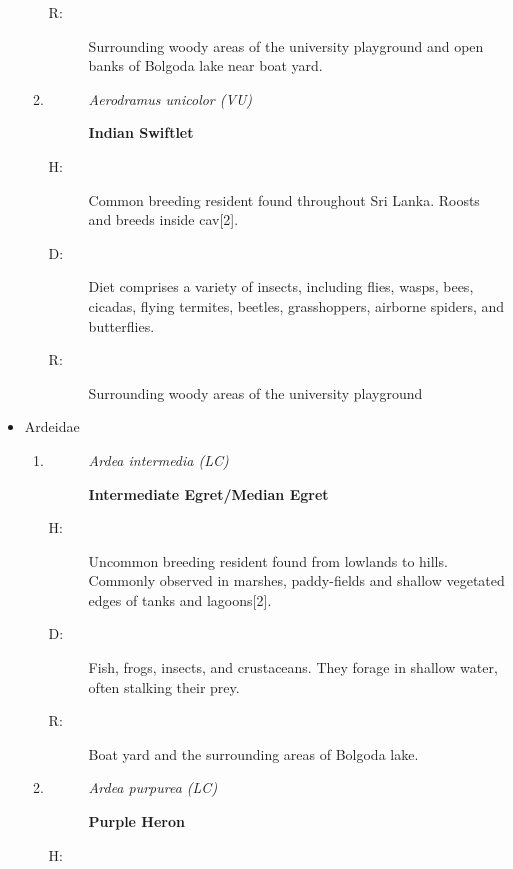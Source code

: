 \begin{itemize}
\begin{enumerate}
\begin{description}
\item[R: ]%
Surrounding woody areas of the university playground and open banks of Bolgoda lake near boat yard.%
\end{description}%
\item%
\begin{description}%
\item[]%
\textit{Aerodramus unicolor (VU)}%
\item[]%
\textbf{Indian Swiftlet}%
\end{description}%
\begin{description}%
\item[H: ]%
Common breeding resident found throughout Sri Lanka. Roosts and breeds inside cav{[}2{]}.%
\item[D: ]%
Diet comprises a variety of insects, including flies, wasps, bees, cicadas, flying termites, beetles, grasshoppers, airborne spiders, and butterflies.%
\item[R: ]%
Surrounding woody areas of the university playground%
\end{description}%
\end{enumerate}%
\item%
Ardeidae%
\begin{enumerate}%
\item%
\begin{description}%
\item[]%
\textit{Ardea intermedia (LC)}%
\item[]%
\textbf{Intermediate Egret/Median Egret}%
\end{description}%
\begin{description}%
\item[H: ]%
Uncommon breeding resident found from lowlands to hills. Commonly observed in marshes, paddy-fields and shallow vegetated edges of tanks and lagoons{[}2{]}.%
\item[D: ]%
Fish, frogs, insects, and crustaceans. They forage in shallow water, often stalking their prey.%
\item[R: ]%
Boat yard and the surrounding areas of Bolgoda lake.%
\end{description}%
\item%
\begin{description}%
\item[]%
\textit{Ardea purpurea (LC)}%
\item[]%
\textbf{Purple Heron}%
\end{description}%
\begin{description}%
\item[H: ]%

\end{description}
\end{enumerate}
\end{itemize}
